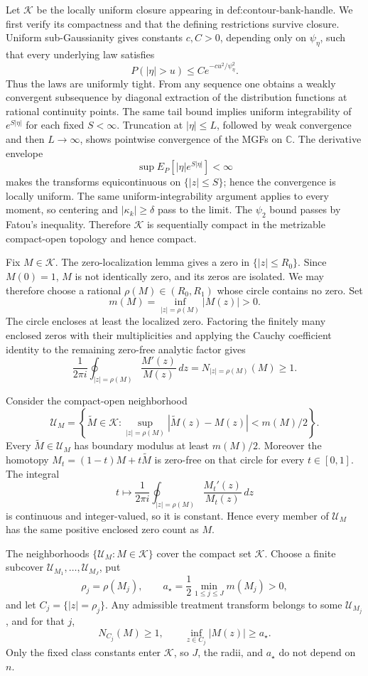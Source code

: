 Let \(\mathscr K\) be the locally uniform closure appearing in \(\text{def:contour-bank-handle}\).  We first verify its compactness and that the defining restrictions survive closure.  Uniform sub-Gaussianity gives constants \(c,C>0\), depending only on \(\psi_{\eta}\), such that every underlying law satisfies
\[
 P(|\eta|>u)\le C e^{-cu^2/\psi_{\eta}^{2}}.
\]
Thus the laws are uniformly tight.  From any sequence one obtains a weakly convergent subsequence by diagonal extraction of the distribution functions at rational continuity points.  The same tail bound implies uniform integrability of \(e^{S|\eta|}\) for each fixed \(S<\infty\).  Truncation at \(|\eta|\le L\), followed by weak convergence and then \(L\to\infty\), shows pointwise convergence of the MGFs on \(\mathbb C\).  The derivative envelope
\[
 \sup E_P[|\eta|e^{S|\eta|}]<\infty
\]
makes the transforms equicontinuous on \(\{|z|\le S\}\); hence the convergence is locally uniform.  The same uniform-integrability argument applies to every moment, so centering and \(|\kappa_k|\ge\delta\) pass to the limit.  The \(\psi_2\) bound passes by Fatou's inequality.  Therefore \(\mathscr K\) is sequentially compact in the metrizable compact-open topology and hence compact.

Fix \(M\in\mathscr K\).  The zero-localization lemma gives a zero in \(\{|z|\le R_0\}\).  Since \(M(0)=1\), \(M\) is not identically zero, and its zeros are isolated.  We may therefore choose a rational \(\rho(M)\in(R_0,R_1)\) whose circle contains no zero.  Set
\[
 m(M)=\inf_{|z|=\rho(M)}|M(z)|>0.
\]
The circle encloses at least the localized zero.  Factoring the finitely many enclosed zeros with their multiplicities and applying the Cauchy coefficient identity to the remaining zero-free analytic factor gives
\[
 \frac{1}{2\pi i}\oint_{|z|=\rho(M)}\frac{M'(z)}{M(z)}\,dz
 =N_{|z|=\rho(M)}(M)\ge1.
\]

Consider the compact-open neighborhood
\[
 \mathscr U_M
 =\left\{\widetilde M\in\mathscr K:
   \sup_{|z|=\rho(M)}|\widetilde M(z)-M(z)|<m(M)/2\right\}.
\]
Every \(\widetilde M\in\mathscr U_M\) has boundary modulus at least \(m(M)/2\).  Moreover the homotopy \(M_t=(1-t)M+t\widetilde M\) is zero-free on that circle for every \(t\in[0,1]\).  The integral
\[
 t\longmapsto \frac{1}{2\pi i}\oint_{|z|=\rho(M)}\frac{M_t'(z)}{M_t(z)}\,dz
\]
is continuous and integer-valued, so it is constant.  Hence every member of \(\mathscr U_M\) has the same positive enclosed zero count as \(M\).

The neighborhoods \(\{\mathscr U_M:M\in\mathscr K\}\) cover the compact set \(\mathscr K\).  Choose a finite subcover \(\mathscr U_{M_1},\ldots,\mathscr U_{M_J}\), put
\[
 \rho_j=\rho(M_j),
 \qquad
 a_{\star}=\frac12\min_{1\le j\le J}m(M_j)>0,
\]
and let \(C_j=\{|z|=\rho_j\}\).  Any admissible treatment transform belongs to some \(\mathscr U_{M_j}\), and for that \(j\),
\[
 N_{C_j}(M)\ge1,
 \qquad
 \inf_{z\in C_j}|M(z)|\ge a_{\star}.
\]
Only the fixed class constants enter \(\mathscr K\), so \(J\), the radii, and \(a_{\star}\) do not depend on \(n\).